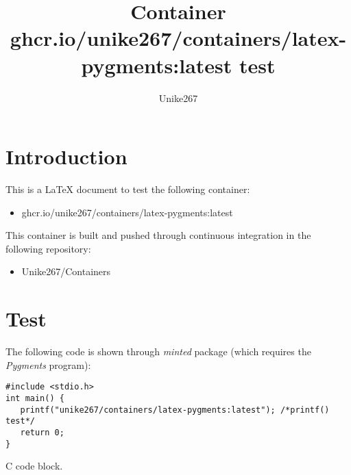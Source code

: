 \documentclass{article}
\begin{document}
\title{Container ghcr.io/unike267/containers/latex-pygments:latest test}
\author{Unike267}
\maketitle

\section{Introduction}

This is a \LaTeX{} document to test the following container:

\begin{itemize}
\item ghcr.io/unike267/containers/latex-pygments:latest
\end{itemize} 

\noindent This container is built and pushed through continuous integration in the following repository:

\begin{itemize}
\item Unike267/Containers
\end{itemize} 

\section{Test}

The following code is shown through \textit{minted} package (which requires the \textit{Pygments} program):

\begin{listing}[!h]
\begin{verbatim}
#include <stdio.h>
int main() {
   printf("unike267/containers/latex-pygments:latest"); /*printf() test*/
   return 0;
} 
\end{verbatim}
\caption{C code block.}
\label{code:1}
\end{listing}
\end{document}
